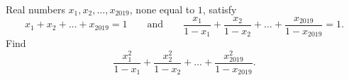 Real numbers $x_1,x_2,\dots,x_{2019}$, none equal to $1$, satisfy
\[
x_1+x_2+\dots+x_{2019}=1\qquad\text{and}\qquad\dfrac{x_1}{1-x_1}+\dfrac{x_2}{1-x_2}+\dots+\dfrac{x_{2019}}{1-x_{2019}}=1 .
\]
Find
\[
\dfrac{x_1^2}{1-x_1}+\dfrac{x_2^2}{1-x_2}+\dots+\dfrac{x_{2019}^2}{1-x_{2019}} .
\]
